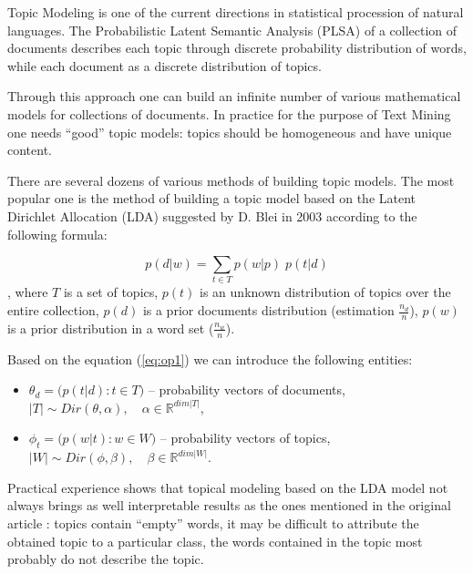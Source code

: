 \documentclass[12pt]{report}
\theoremstyle{definition}
\begin{document}
Topic Modeling is one of the current directions in statistical procession of natural languages. 
The Probabilistic Latent Semantic Analysis (PLSA) \cite{hofmann2017probabilistic} of a collection of documents describes each topic through discrete probability distribution of words, while each document as a discrete distribution of topics.

Through this approach one can build an infinite number of various mathematical models for collections of documents. In practice for the purpose of Text Mining one needs ``good''  topic models: topics should be homogeneous and have unique content.

There are several dozens of various methods of building topic models. The most popular one is the method of building a topic model based on the Latent Dirichlet Allocation (LDA) suggested by D. Blei  in 2003 according to the following formula:

\begin{equation} 
\label{eq:op1}
p \left( d \vert w \right) = \sum_{t \in T} p \left( w \vert p \right) \; p \left( t \vert d \right)
\end{equation},
where $T$ is a set of topics, $p(t)$ is an unknown distribution of topics over the entire collection, $p(d)$ is a prior documents distribution (estimation $\frac{n_d}{n}$),  $p(w)$ is a prior distribution in a word set ($\frac{n_w}{n}$). 

Based on the equation (\ref{eq:op1}) we can introduce the following entities:  

\begin{itemize}
	\item $ \theta_d = \big( p \left( t \vert d \right) : t \in T \big) $ -- probability vectors of documents,  $\vert T \vert  \sim  Dir \left( \theta , \alpha \right) , \quad \alpha \in \mathbb{R}^{dim \vert T \vert}$, 
	\item $ \phi_t   = \big( p \left( w \vert t \right) : w \in W \big) $ -- probability vectors of topics, $ \vert W \vert \sim Dir \left( \phi, \beta \right) , \quad \beta \in \mathbb{R}^{dim \vert W \vert}$.
\end{itemize}

Practical experience shows that topical modeling based on the LDA model not always brings as well interpretable results as the ones mentioned in the original article \cite{blei2012probabilistic}: topics contain ``empty'' words, it may be difficult to attribute the obtained topic to a particular class, the words contained in the topic most probably do not describe the topic. 
\end{document}
